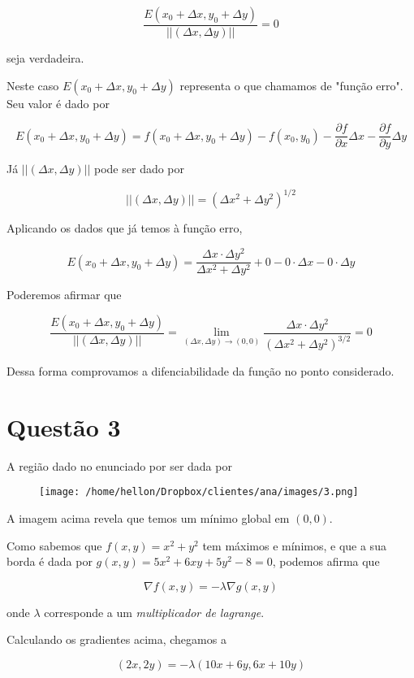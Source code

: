 \documentclass[
	article,			%
	11pt,				%
	oneside,			%
	a4paper,			%
	english,			%
	brazil,				%
	sumario=tradicional
	]{abntex2}
\begin{document}
	$$\dfrac {E( x_0 + \Delta x, y_0 + \Delta y)} {||(\Delta x, \Delta y)||} = 0$$

	seja verdadeira.

	Neste caso $E( x_0 + \Delta x, y_0 + \Delta y)$ representa o que chamamos de "função erro".
	Seu valor é dado por

	$$E( x_0 + \Delta x, y_0 + \Delta y) =  f( x_0 + \Delta x, y_0 + \Delta y)  - f(x_0, y_0) - \dfrac {\partial f} {\partial x} \Delta x - \dfrac {\partial f} {\partial y} \Delta y $$

	Já $||(\Delta x, \Delta y)||$ pode ser dado por

	$$||(\Delta x, \Delta y)|| = (\Delta x^2 + \Delta y^2)^{1/2}$$

	Aplicando os dados que já temos à função erro,

	$$E( x_0 + \Delta x, y_0 + \Delta y) = \dfrac{\Delta x \cdot \Delta y^2}{\Delta x^2 + \Delta y^2} + 0 - 0 \cdot \Delta x - 0 \cdot \Delta y$$

	Poderemos afirmar que

	$$\dfrac {E( x_0 + \Delta x, y_0 + \Delta y)} {||(\Delta x, \Delta y)||} = \lim_{(\Delta x, \Delta y)\to(0,0) } \dfrac{\Delta x \cdot \Delta y^2}{(\Delta x^2 + \Delta y^2)^{3/2}} = 0$$

	Dessa forma comprovamos a difenciabilidade da função no ponto considerado.

	\section*{Questão 3}
	A região dado no enunciado por ser dada por


	\begin{figure}[!ht]
		\centering
		\texttt{[image: /home/hellon/Dropbox/clientes/ana/images/3.png]}
	\end{figure}

	A imagem acima revela que temos um mínimo global em $(0,0)$.

	Como sabemos que $f(x,y) = x^2 +y^2$ tem máximos e mínimos, e que a sua borda é dada por $g(x,y) = 5x^2+6xy+5y^2-8=0$, podemos afirma que

	$$\nabla f(x,y) =  - \lambda \nabla g(x,y) $$

	onde $\lambda$ corresponde a um \textit{multiplicador de lagrange}.

	Calculando os gradientes acima, chegamos a

	$$(2x,2y) = - \lambda  (10x+6 y, 6x+10 y)$$
\end{document}
